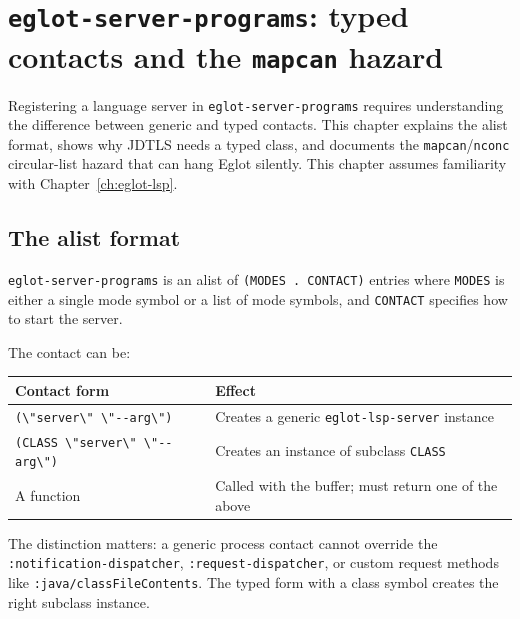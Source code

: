 \chapter{\texttt{eglot-server-programs}: typed contacts and the \texttt{mapcan} hazard}
\label{ch:eglot-server-programs}
\minitoc\label{eglot-server-programs-typed-contacts-and-the-mapcan-hazard}

Registering a language server in \texttt{eglot-server-programs}
requires understanding the difference between generic and typed
contacts.  This chapter explains the alist format, shows why JDTLS
needs a typed class, and documents the \texttt{mapcan}/\texttt{nconc}
circular-list hazard that can hang Eglot silently.
This chapter assumes familiarity with Chapter~\ref{ch:eglot-lsp}.

\section{The alist format}\label{the-alist-format}

\texttt{eglot-server-programs} is an alist of \texttt{(MODES . CONTACT)} entries where \texttt{MODES} is either a single mode symbol or a list of mode symbols, and \texttt{CONTACT} specifies how to start the server.

The contact can be:

\begin{longtable}[]{@{}ll@{}}
\toprule
Contact form & Effect \\
\midrule
\texttt{(\textbackslash{}"server\textbackslash{}" \textbackslash{}"-\/-arg\textbackslash{}")} & Creates a generic \texttt{eglot-lsp-server} instance \\
\texttt{(CLASS \textbackslash{}"server\textbackslash{}" \textbackslash{}"-\/-arg\textbackslash{}")} & Creates an instance of subclass \texttt{CLASS} \\
A function & Called with the buffer; must return one of the above \\
\bottomrule
\end{longtable}

The distinction matters: a generic process contact cannot override the \texttt{:notification-dispatcher}, \texttt{:request-dispatcher}, or custom request methods like \texttt{:java/classFileContents}. The typed form with a class symbol creates the right subclass instance.

